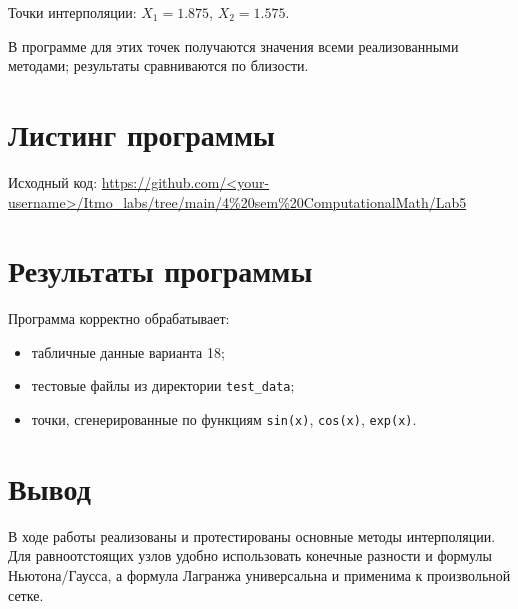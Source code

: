 \documentclass[14pt,a4paper]{extarticle}
\begin{document}
Точки интерполяции: $X_1=1.875$, $X_2=1.575$.

В программе для этих точек получаются значения всеми реализованными методами; результаты сравниваются по близости.

\section*{Листинг программы}
Исходный код: \url{https://github.com/<your-username>/Itmo_labs/tree/main/4%20sem%20ComputationalMath/Lab5}

\section*{Результаты программы}
Программа корректно обрабатывает:
\begin{itemize}
    \item табличные данные варианта 18;
    \item тестовые файлы из директории \texttt{test\_data};
    \item точки, сгенерированные по функциям \texttt{sin(x)}, \texttt{cos(x)}, \texttt{exp(x)}.
\end{itemize}

\section*{Вывод}
В ходе работы реализованы и протестированы основные методы интерполяции. Для равноотстоящих узлов удобно использовать конечные разности и формулы Ньютона/Гаусса, а формула Лагранжа универсальна и применима к произвольной сетке.
\end{document}
